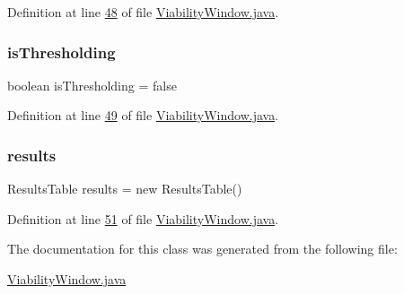 Definition at line \hyperlink{_viability_window_8java_source_l00048}{48} of file \hyperlink{_viability_window_8java_source}{Viability\+Window.\+java}.

\hypertarget{classgui_1_1_viability_window_a3c3ae31647b93ff77785eb37236fbcb7}{}\label{classgui_1_1_viability_window_a3c3ae31647b93ff77785eb37236fbcb7} 
\subsubsection{\texorpdfstring{is\+Thresholding}{isThresholding}}
{\footnotesize\ttfamily boolean is\+Thresholding = false\hspace{0.3cm}{\ttfamily [private]}}



Definition at line \hyperlink{_viability_window_8java_source_l00049}{49} of file \hyperlink{_viability_window_8java_source}{Viability\+Window.\+java}.

\hypertarget{classgui_1_1_viability_window_a15c93e0c8f542fcf3b3505943a26489d}{}\label{classgui_1_1_viability_window_a15c93e0c8f542fcf3b3505943a26489d} 
\subsubsection{\texorpdfstring{results}{results}}
{\footnotesize\ttfamily Results\+Table results = new Results\+Table()\hspace{0.3cm}{\ttfamily [private]}}



Definition at line \hyperlink{_viability_window_8java_source_l00051}{51} of file \hyperlink{_viability_window_8java_source}{Viability\+Window.\+java}.



The documentation for this class was generated from the following file\+:\begin{DoxyCompactItemize}
\item 
\hyperlink{_viability_window_8java}{Viability\+Window.\+java}\end{DoxyCompactItemize}

